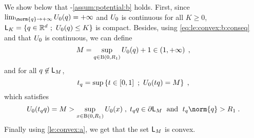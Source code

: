   We show below that -\ref{assum:potential:b}
  holds. First, since $\lim_{\norm{\q} \to \plusinfty} \F_0(\q) = \plusinfty$ and $U_0$ is continuous  for all $K \geq 0$, $\mathsf{L}_K=\{ q \in \mathbb{R}^d \ ; \ U_0(q) \leq K\}$
 is compact. Besides, using \eqref{eq:le:convex:b:conseq} and that $U_0$ is continuous,  we can define
  \begin{equation}
    \label{eq:def_M_le:convex}
M =  \sup_{q \in \operatorname{B}(0,R_1)} U_0(q) +1 \in \left(1, +\infty\right)\;,
  \end{equation}
and for all $q \not \in \mathsf{L}_M$,
\begin{equation}
  \label{eq:deftq_le:convex_0}
 t_q = \sup \left\lbrace  t \in \left[0,1\right] \ ; \ U_0(t q ) =M  \right\rbrace \;,
\end{equation}
 which satisfies
  \begin{equation}
    \label{eq:deftq_le:convex}
    \F_0(t_{\q} \q) = M > \sup_{\x \in \ball{0}{\Rexp}} \F_0(\x) \eqsp, \eqsp t_{\q} q \in \partial \lset_M \eqsp \text{ and } \eqsp t_{\q}
  \norm{\q} > \Rexp \eqsp.
  \end{equation}
 Finally using \ref{le:convex:a}, we get that the set
  $\mathsf{L}_M$  is
  convex.

